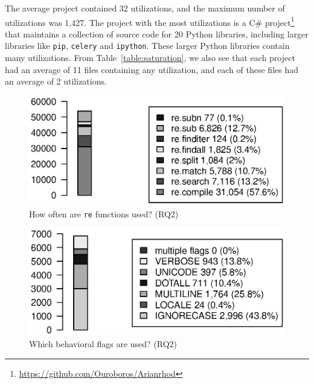 The average project contained 32 utilizations, and the maximum number of utilizations was 1,427.  The project with the most utilizations is a C\# project\footnote{\url{https://github.com/Ouroboros/Arianrhod}} that maintains a collection of source code for 20 Python libraries, including larger libraries like {\tt pip}, {\tt celery} and {\tt ipython}.  These larger Python libraries contain many utilizations.
From Table~\ref{table:saturation}, we also see that each project had an average of 11 files containing any utilization, and each of these files had an average of 2 utilizations.







\begin{figure}[tb]
\centering
\includegraphics[width=\columnwidth]{../analysis_output/partFunctions.eps}
\vspace{-6pt}
\caption{How often are  {\tt re} functions used? (RQ2)}
\vspace{-6pt}
\label{fig:partFunctions}
\end{figure}

\begin{figure}[tb]
\centering
\includegraphics[width=0.9\columnwidth]{../analysis_output/partFlags.eps}
\vspace{-6pt}
\caption{Which behavioral flags are used? (RQ2)}
\label{fig:partFlags}
\end{figure}

